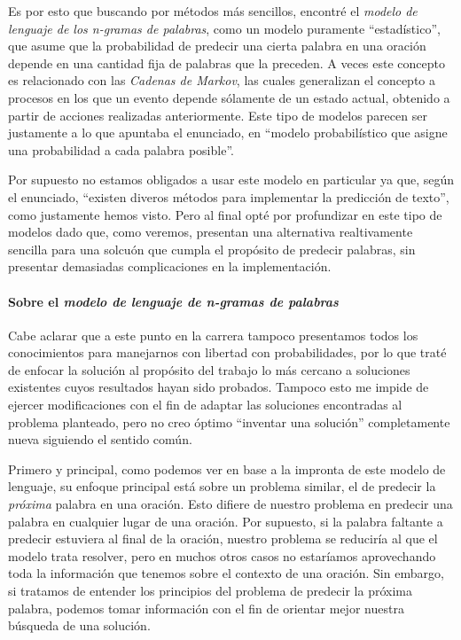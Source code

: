 \documentclass[a4paper]{article}
\begin{document}
Es por esto que buscando por métodos más sencillos, encontré el \textit{modelo de lenguaje de los n-gramas de palabras}, como un modelo puramente ``estadístico'', que asume que la probabilidad de predecir una cierta palabra en una oración depende en una cantidad fija de palabras que la preceden\cite{WikiNgramModel}. A veces este concepto es relacionado con las \textit{Cadenas de Markov}, las cuales generalizan el concepto a procesos en los que un evento depende sólamente de un estado actual, obtenido a partir de acciones realizadas anteriormente\cite{WikiMarkov}. Este tipo de modelos parecen ser justamente a lo que apuntaba el enunciado, en ``modelo probabilístico que asigne una probabilidad a cada palabra posible''.

Por supuesto no estamos obligados a usar este modelo en particular ya que, según el enunciado, ``existen diveros métodos para implementar la predicción de texto'', como justamente hemos visto. Pero al final opté por profundizar en este tipo de modelos dado que, como veremos, presentan una alternativa realtivamente sencilla para una solcuón que cumpla el propósito de predecir palabras, sin presentar demasiadas complicaciones en la implementación.

\paragraph{Sobre el \textit{modelo de lenguaje de n-gramas de palabras}}

Cabe aclarar que a este punto en la carrera tampoco presentamos todos los conocimientos para manejarnos con libertad con probabilidades, por lo que traté de enfocar la solución al propósito del trabajo lo más cercano a soluciones existentes cuyos resultados hayan sido probados. Tampoco esto me impide de ejercer modificaciones con el fin de adaptar las soluciones encontradas al problema planteado, pero no creo óptimo ``inventar una solución'' completamente nueva siguiendo el sentido común. 

Primero y principal, como podemos ver en base a la impronta de este modelo de lenguaje, su enfoque principal está sobre un problema similar, el de predecir la \textit{próxima} palabra en una oración. Esto difiere de nuestro problema en predecir una palabra en cualquier lugar de una oración. Por supuesto, si la palabra faltante a predecir estuviera al final de la oración, nuestro problema se reduciría al que el modelo trata resolver, pero en muchos otros casos no estaríamos aprovechando toda la información que tenemos sobre el contexto de una oración. Sin embargo, si tratamos de entender los principios del problema de predecir la próxima palabra, podemos tomar información con el fin de orientar mejor nuestra búsqueda de una solución. \\
\end{document}
